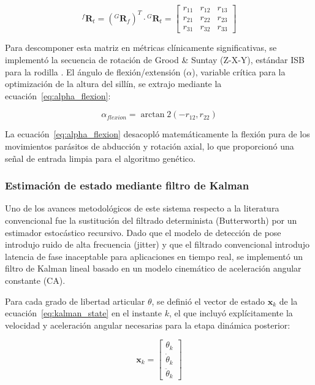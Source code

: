 \begin{equation}
  \label{eq:rotation_matrix}
  {}^f\mathbf{R}_t = ({}^G\mathbf{R}_f)^T \cdot {}^G\mathbf{R}_t = \begin{bmatrix} r_{11} & r_{12} & r_{13} \\ r_{21} & r_{22} & r_{23} \\ r_{31} & r_{32} & r_{33} \end{bmatrix}
\end{equation}

Para descomponer esta matriz en métricas clínicamente significativas, se
implementó la secuencia de rotación de Grood \& Suntay (Z-X-Y), estándar ISB
para la rodilla \citep{GroodSuntay1983}. El ángulo de flexión/extensión
($\alpha$), variable crítica para la optimización de la altura del sillín, se
extrajo mediante la ecuación~\ref{eq:alpha_flexion}:

\begin{equation}
  \label{eq:alpha_flexion}
  \alpha_{flexion} = \arctan2(-r_{12}, r_{22})
\end{equation}

La ecuación~\ref{eq:alpha_flexion} desacopló matemáticamente la flexión pura de los movimientos
parásitos de abducción y rotación axial, lo que proporcionó una señal de
entrada limpia para el algoritmo genético.

\subsubsection{Estimación de estado mediante filtro de Kalman}
Uno de los avances metodológicos de este sistema respecto a la literatura
convencional fue la sustitución del filtrado determinista (Butterworth)
\citep{Winter2009_Biomechanics} por un estimador estocástico recursivo. Dado
que el modelo de detección de pose introdujo ruido de alta frecuencia (jitter)
y que el filtrado convencional introdujo latencia de fase inaceptable para
aplicaciones en tiempo real, se implementó un filtro de Kalman lineal
\citep{ucm:kalman} basado en un modelo cinemático de aceleración angular
constante (CA).

Para cada grado de libertad articular $\theta$, se definió el vector de estado
$\mathbf{x}_k$ de la ecuación~\ref{eq:kalman_state} en el instante $k$, el que incluyó explícitamente la velocidad y
aceleración angular necesarias para la etapa dinámica posterior:

\begin{equation}
  \label{eq:kalman_state}
  \mathbf{x}_k = \begin{bmatrix} \theta_k \\ \dot{\theta}_k \\ \ddot{\theta}_k \end{bmatrix}
\end{equation}

